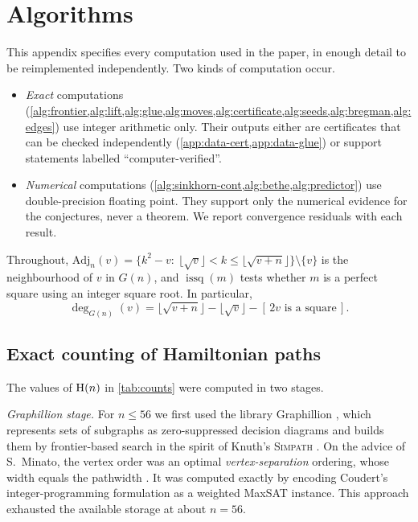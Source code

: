 \section{Algorithms}\label{app:algorithms}

This appendix specifies every computation used in the paper, in enough detail to be
reimplemented independently. Two kinds of computation occur.
\begin{itemize}
\item \emph{Exact} computations (\cref{alg:frontier,alg:lift,alg:glue,alg:moves,alg:certificate,alg:seeds,alg:bregman,alg:edges})
use integer arithmetic only. Their outputs either are certificates that can be checked
independently (\cref{app:data-cert,app:data-glue}) or support statements labelled
``computer-verified''.
\item \emph{Numerical} computations (\cref{alg:sinkhorn-cont,alg:bethe,alg:predictor}) use
double-precision floating point. They support only the numerical evidence for the
conjectures, never a theorem. We report convergence residuals with each result.
\end{itemize}
Throughout, $\mathrm{Adj}_n(v)=\{k^2-v:\ \lfloor\sqrt v\rfloor<k\le\lfloor\sqrt{v+n}\rfloor\}\setminus\{v\}$ is the
neighbourhood of $v$ in $G(n)$, and $\operatorname{issq}(m)$ tests whether $m$ is a perfect square
using an integer square root. In particular,
\begin{equation}\label{eq:deg}
\deg_{G(n)}(v)=\lfloor\sqrt{v+n}\rfloor-\lfloor\sqrt v\rfloor-[\,2v\text{ is a square}\,].
\end{equation}

\subsection{Exact counting of Hamiltonian paths}
The values of $\mathrm{H}(n)$ in \cref{tab:counts} were computed in two stages.

\emph{Graphillion stage.} For $n\le56$ we first used the library Graphillion \cite{graphillion},
which represents sets of subgraphs as zero-suppressed decision diagrams \cite{Minato1993} and
builds them by frontier-based search in the spirit of Knuth's \textsc{Simpath}
\cite[\S7.1.4]{KnuthTAOCP4A}. On the advice of S.~Minato, the vertex order was an optimal
\emph{vertex-separation} ordering, whose width equals the pathwidth \cite{Kinnersley}. It was
computed exactly by encoding Coudert's integer-programming formulation \cite{Coudert} as a weighted
MaxSAT instance. This approach exhausted the available storage at about $n=56$.

